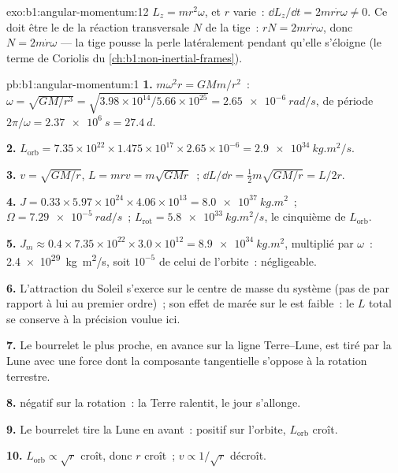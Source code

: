 \begin{solution}{exo:b1:angular-momentum:12}
$L_z = mr^2\omega$, et $r$ varie~: $\dd L_z/\dd t = 2mr\dot r\omega \neq 0$.
Ce doit être le  de la réaction transversale $N$ de la tige~: $rN =
2mr\dot r\omega$, donc $N = 2m\dot r\omega$ --- la tige pousse la perle
latéralement pendant qu'elle s'éloigne (le terme de Coriolis du
\cref{ch:b1:non-inertial-frames}).
\end{solution}

\begin{solution}{pb:b1:angular-momentum:1}
\textbf{1.} $m\omega^2r = GMm/r^2$~: $\omega = \sqrt{GM/r^3} = \sqrt{3.98\times
10^{14}/5.66\times10^{25}} = \qty{2.65e-6}{rad/s}$, de période $2\pi/\omega =
\qty{2.37e6}{s} = \qty{27.4}{d}$.

\textbf{2.} $L_{\text{orb}} = 7.35\times10^{22} \times 1.475\times10^{17}
\times 2.65\times10^{-6} = \qty{2.9e34}{kg.m^2/s}$.

\textbf{3.} $v = \sqrt{GM/r}$, $L = mrv = m\sqrt{GMr}$~; $\dd L/\dd r =
\tfrac12 m\sqrt{GM/r} = L/2r$.

\textbf{4.} $J = 0.33 \times 5.97\times10^{24} \times 4.06\times10^{13} =
\qty{8.0e37}{kg.m^2}$~; $\Omega = \qty{7.29e-5}{rad/s}$~; $L_{\text{rot}} =
\qty{5.8e33}{kg.m^2/s}$, le cinquième de $L_{\text{orb}}$.

\textbf{5.} $J_m \approx 0.4 \times 7.35\times10^{22} \times 3.0\times10^{12} =
\qty{8.9e34}{kg.m^2}$, multiplié par $\omega$~: \qty{2.4e29}{kg.m^2/s}, soit $10^{-5}$
de celui de l'orbite~: négligeable.

\textbf{6.} L'attraction du Soleil s'exerce sur le centre de masse du
système (pas de  par rapport à lui au premier ordre)~; son effet
de marée sur le  est faible~: le $L$ total se conserve à la
précision voulue ici.

\textbf{7.} Le bourrelet le plus proche, en avance sur la ligne
Terre--Lune, est tiré par la Lune avec une force dont la composante
tangentielle s'oppose à la rotation terrestre.

\textbf{8.}  négatif sur la rotation~: la Terre ralentit, le jour
s'allonge.

\textbf{9.} Le bourrelet tire la Lune en avant~:  positif sur
l'orbite, $L_{\text{orb}}$ croît.

\textbf{10.} $L_{\text{orb}} \propto \sqrt r$ croît, donc $r$ croît~; $v \propto
1/\sqrt r$ décroît.


\end{solution}

